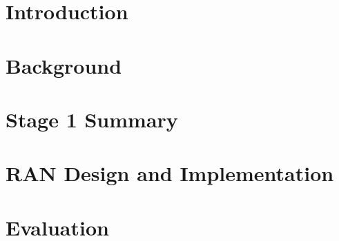 \documentclass[a4paper,12pt]{report}
\renewcommand{\headrulewidth}{0pt}
\begin{document}
\fancyfoot[CO]{\thepage}

\newpage
\setcounter{page}{3}
% 
% 	
% 
\tableofcontents
\listoffigures
\newpage
{}
\fancyhead[RO]{\thepage}
\fancyhead[LO]{\slshape \leftmark}
\fancyfoot[CO]{}
\renewcommand{\headrulewidth}{0.5pt}
\chapter{Introduction \label{chap:Introduction}}


\chapter{Background \label{chap:Background}}


\chapter{Stage 1 Summary\label{chap:UPFRTC}}


\chapter{RAN Design and Implementation\label{chap:RANDesignandImplementation}}


\chapter{Evaluation\label{chap:Evaluation}}





\begin{spacing}{1}


\end{spacing}
\end{document}
